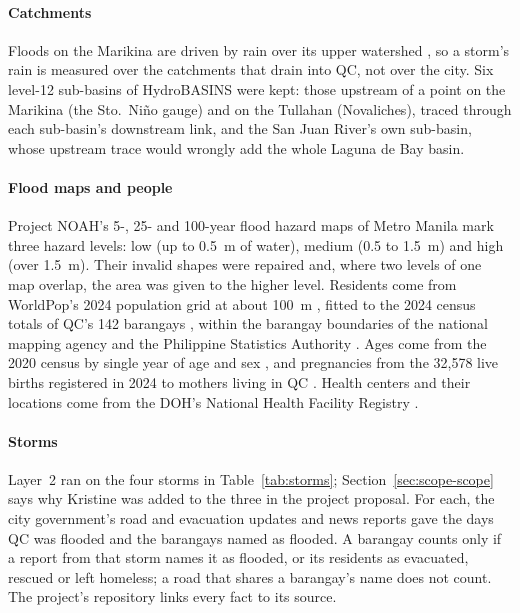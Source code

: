 \paragraph{Catchments}
Floods on the Marikina are driven by rain over its upper watershed \parencite{abon2011}, so a
storm's rain is measured over the catchments that drain into QC, not over the city. Six level-12
sub-basins of HydroBASINS \parencite{lehner2013} were kept: those upstream of a point on
the Marikina (the Sto.~Niño gauge) and on the Tullahan (Novaliches), traced through each
sub-basin's downstream link, and the San Juan River's own sub-basin, whose upstream trace would
wrongly add the whole Laguna de Bay basin.

\paragraph{Flood maps and people}
Project NOAH's 5-, 25- and 100-year flood hazard maps of Metro Manila \parencite{noah_nd} mark
three hazard levels: low (up to 0.5~m of water), medium (0.5 to 1.5~m) and high (over 1.5~m).
Their invalid shapes were repaired and, where two levels of one map overlap, the area was given
to the higher level. Residents come from WorldPop's 2024 population grid at about 100~m
\parencite{bondarenko2025}, fitted to the 2024 census totals of QC's 142 barangays
\parencite{psa_census2024}, within the barangay boundaries of the national mapping agency and the
Philippine Statistics Authority \parencite{namria_codab2025}. Ages come from the 2020 census by single year of age and sex
\parencite{psa_age2020}, and pregnancies from the 32,578 live births registered in 2024 to
mothers living in QC \parencite{psa_births2026}. Health centers and their locations come from
the DOH's National Health Facility Registry \parencite{doh_nhfr}.

\paragraph{Storms}
Layer~2 ran on the four storms in Table~\ref{tab:storms}; Section~\ref{sec:scope-scope} says why
Kristine was added to the three in the project proposal. For each, the city government's road and
evacuation updates and news reports gave the days QC was flooded and the barangays named as
flooded. A barangay counts only if a report from that storm names it as flooded, or its residents
as evacuated, rescued or left homeless; a road that shares a barangay's name does not count. The
project's repository links every fact to its source.

